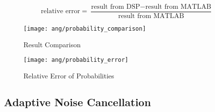 \begin{equation}
\label{eq:relative_error}
\text{relative error} = \frac{\text{result from DSP} - \text{result from MATLAB}}{\text{result from MATLAB}}
\end{equation}

\begin{figure}[H]
\begin{minipage}[t]{0.5\linewidth}
\centering
\texttt{[image: ang/probability\_comparison]}
\caption{Result Comparison}
\label{probability_comparison}
\end{minipage}
\begin{minipage}[t]{0.5\linewidth}
\centering
\texttt{[image: ang/probability\_error]}
\caption{Relative Error of Probabilities}
\label{probability_error}
\end{minipage}
\end{figure}


\subsection{Adaptive Noise Cancellation}
